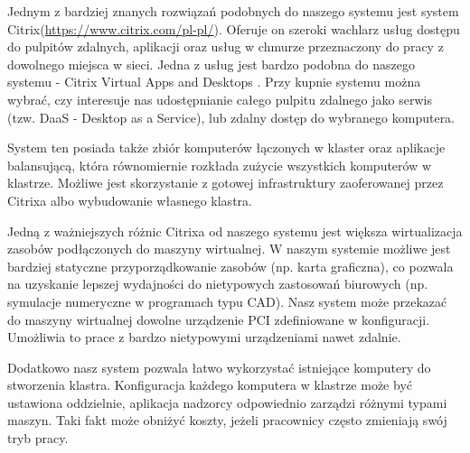 \documentclass[../wstep.tex]{subfiles}
\begin{document}
Jednym z bardziej znanych rozwiązań podobnych do naszego systemu jest system Citrix(\url{https://www.citrix.com/pl-pl/}).
Oferuje on szeroki wachlarz usług dostępu do pulpitów zdalnych, aplikacji oraz usług w chmurze przeznaczony do pracy z dowolnego miejsca w sieci.
Jedna z usług jest bardzo podobna do naszego systemu - Citrix Virtual Apps and Desktops \parencite{citrix-daas}.
Przy kupnie systemu można wybrać, czy interesuje nas udostępnianie całego pulpitu zdalnego jako serwis (tzw. DaaS - Desktop as a Service), lub zdalny dostęp do wybranego komputera.

System ten posiada także zbiór komputerów łączonych w klaster oraz aplikacje balansującą, która równomiernie rozkłada zużycie wszystkich komputerów w klastrze.
Możliwe jest skorzystanie z gotowej infrastruktury zaoferowanej przez Citrixa albo wybudowanie własnego klastra.

Jedną z ważniejszych różnic Citrixa od naszego systemu jest większa wirtualizacja zasobów podłączonych do maszyny wirtualnej.
W naszym systemie możliwe jest bardziej statyczne przyporządkowanie zasobów (np. karta graficzna), co pozwala na uzyskanie lepszej wydajności do nietypowych zastosowań biurowych (np. symulacje numeryczne w programach typu CAD).
Nasz system może przekazać do maszyny wirtualnej dowolne urządzenie PCI zdefiniowane w konfiguracji.
Umożliwia to prace z bardzo nietypowymi urządzeniami nawet zdalnie.

Dodatkowo nasz system pozwala łatwo wykorzystać istniejące komputery do stworzenia klastra.
Konfiguracja każdego komputera w klastrze może być ustawiona oddzielnie, aplikacja nadzorcy odpowiednio zarządzi różnymi typami maszyn.
Taki fakt może obniżyć koszty, jeżeli pracownicy często zmieniają swój tryb pracy.
\end{document}
